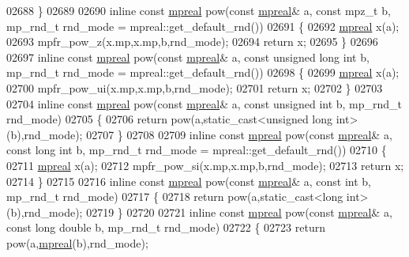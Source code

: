 \begin{DoxyCode}
{{02688 \}
02689 
02690 \textcolor{keyword}{inline} \textcolor{keyword}{const} \hyperlink{classmpfr_1_1mpreal}{mpreal} pow(\textcolor{keyword}{const} \hyperlink{classmpfr_1_1mpreal}{mpreal}& a, \textcolor{keyword}{const} mpz\_t b, mp\_rnd\_t rnd\_mode = 
      mpreal::get\_default\_rnd())
02691 \{
02692     \hyperlink{classmpfr_1_1mpreal}{mpreal} x(a);
02693     mpfr\_pow\_z(x.mp,x.mp,b,rnd\_mode);
02694     \textcolor{keywordflow}{return} x;
02695 \}
02696 
02697 \textcolor{keyword}{inline} \textcolor{keyword}{const} \hyperlink{classmpfr_1_1mpreal}{mpreal} pow(\textcolor{keyword}{const} \hyperlink{classmpfr_1_1mpreal}{mpreal}& a, \textcolor{keyword}{const} \textcolor{keywordtype}{unsigned} \textcolor{keywordtype}{long} \textcolor{keywordtype}{int} b, mp\_rnd\_t rnd\_mode = 
      mpreal::get\_default\_rnd())
02698 \{
02699     \hyperlink{classmpfr_1_1mpreal}{mpreal} x(a);
02700     mpfr\_pow\_ui(x.mp,x.mp,b,rnd\_mode);
02701     \textcolor{keywordflow}{return} x;
02702 \}
02703 
02704 \textcolor{keyword}{inline} \textcolor{keyword}{const} \hyperlink{classmpfr_1_1mpreal}{mpreal} pow(\textcolor{keyword}{const} \hyperlink{classmpfr_1_1mpreal}{mpreal}& a, \textcolor{keyword}{const} \textcolor{keywordtype}{unsigned} \textcolor{keywordtype}{int} b, mp\_rnd\_t rnd\_mode)
02705 \{
02706     \textcolor{keywordflow}{return} pow(a,static\_cast<unsigned long int>(b),rnd\_mode);
02707 \}
02708 
02709 \textcolor{keyword}{inline} \textcolor{keyword}{const} \hyperlink{classmpfr_1_1mpreal}{mpreal} pow(\textcolor{keyword}{const} \hyperlink{classmpfr_1_1mpreal}{mpreal}& a, \textcolor{keyword}{const} \textcolor{keywordtype}{long} \textcolor{keywordtype}{int} b, mp\_rnd\_t rnd\_mode = 
      mpreal::get\_default\_rnd())
02710 \{
02711     \hyperlink{classmpfr_1_1mpreal}{mpreal} x(a);
02712     mpfr\_pow\_si(x.mp,x.mp,b,rnd\_mode);
02713     \textcolor{keywordflow}{return} x;
02714 \}
02715 
02716 \textcolor{keyword}{inline} \textcolor{keyword}{const} \hyperlink{classmpfr_1_1mpreal}{mpreal} pow(\textcolor{keyword}{const} \hyperlink{classmpfr_1_1mpreal}{mpreal}& a, \textcolor{keyword}{const} \textcolor{keywordtype}{int} b, mp\_rnd\_t rnd\_mode)
02717 \{
02718     \textcolor{keywordflow}{return} pow(a,static\_cast<long int>(b),rnd\_mode);
02719 \}
02720 
02721 \textcolor{keyword}{inline} \textcolor{keyword}{const} \hyperlink{classmpfr_1_1mpreal}{mpreal} pow(\textcolor{keyword}{const} \hyperlink{classmpfr_1_1mpreal}{mpreal}& a, \textcolor{keyword}{const} \textcolor{keywordtype}{long} \textcolor{keywordtype}{double} b, mp\_rnd\_t rnd\_mode)
02722 \{
02723     \textcolor{keywordflow}{return} pow(a,\hyperlink{classmpfr_1_1mpreal}{mpreal}(b),rnd\_mode);
}}
\end{DoxyCode}

